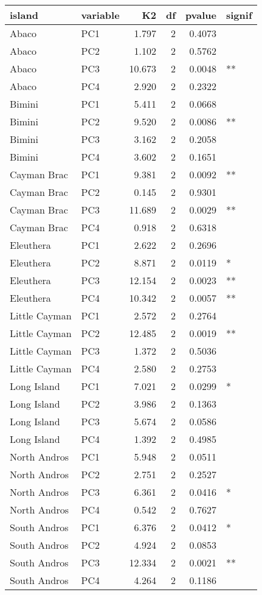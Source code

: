 
\begin{tabular}{llrrrl}
\toprule
island & variable & K2 & df & pvalue & signif\\
\midrule
Abaco & PC1 & 1.797 & 2 & 0.4073 & \\
Abaco & PC2 & 1.102 & 2 & 0.5762 & \\
Abaco & PC3 & 10.673 & 2 & 0.0048 & **\\
Abaco & PC4 & 2.920 & 2 & 0.2322 & \\
Bimini & PC1 & 5.411 & 2 & 0.0668 & \\
\addlinespace
Bimini & PC2 & 9.520 & 2 & 0.0086 & **\\
Bimini & PC3 & 3.162 & 2 & 0.2058 & \\
Bimini & PC4 & 3.602 & 2 & 0.1651 & \\
Cayman Brac & PC1 & 9.381 & 2 & 0.0092 & **\\
Cayman Brac & PC2 & 0.145 & 2 & 0.9301 & \\
\addlinespace
Cayman Brac & PC3 & 11.689 & 2 & 0.0029 & **\\
Cayman Brac & PC4 & 0.918 & 2 & 0.6318 & \\
Eleuthera & PC1 & 2.622 & 2 & 0.2696 & \\
Eleuthera & PC2 & 8.871 & 2 & 0.0119 & *\\
Eleuthera & PC3 & 12.154 & 2 & 0.0023 & **\\
\addlinespace
Eleuthera & PC4 & 10.342 & 2 & 0.0057 & **\\
Little Cayman & PC1 & 2.572 & 2 & 0.2764 & \\
Little Cayman & PC2 & 12.485 & 2 & 0.0019 & **\\
Little Cayman & PC3 & 1.372 & 2 & 0.5036 & \\
Little Cayman & PC4 & 2.580 & 2 & 0.2753 & \\
\addlinespace
Long Island & PC1 & 7.021 & 2 & 0.0299 & *\\
Long Island & PC2 & 3.986 & 2 & 0.1363 & \\
Long Island & PC3 & 5.674 & 2 & 0.0586 & \\
Long Island & PC4 & 1.392 & 2 & 0.4985 & \\
North Andros & PC1 & 5.948 & 2 & 0.0511 & \\
\addlinespace
North Andros & PC2 & 2.751 & 2 & 0.2527 & \\
North Andros & PC3 & 6.361 & 2 & 0.0416 & *\\
North Andros & PC4 & 0.542 & 2 & 0.7627 & \\
South Andros & PC1 & 6.376 & 2 & 0.0412 & *\\
South Andros & PC2 & 4.924 & 2 & 0.0853 & \\
\addlinespace
South Andros & PC3 & 12.334 & 2 & 0.0021 & **\\
South Andros & PC4 & 4.264 & 2 & 0.1186 & \\
\bottomrule
\end{tabular}
